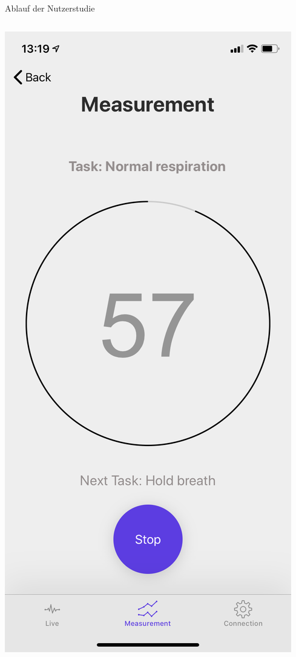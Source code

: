 \documentclass[18pt]{beamer}
\begin{document}
\begin{frame}{Ablauf der Nutzerstudie}
\begin{center}
\begin{columns}[T]
\begin{column}{.33\textwidth}
                \centering
                \includegraphics[scale=0.1]{images/app/measurement_timer_02.png}
            \end{column}%
        \end{columns} 
    \end{center}
\end{frame}
\end{document}
